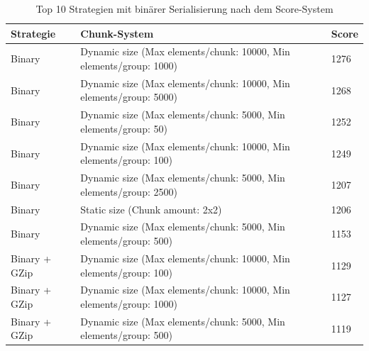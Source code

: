 \begin{table}[htp]
    \centering
    \caption{Top 10 Strategien mit binärer Serialisierung nach dem Score-System}
    \begin{tabular}{|l|l|l|}
    \hline
        Strategie & Chunk-System & Score \\
        \hline
        Binary & Dynamic size (Max elements/chunk: 10000, Min elements/group: 1000) & 1276\\
        Binary & Dynamic size (Max elements/chunk: 10000, Min elements/group: 5000) & 1268\\
        Binary & Dynamic size (Max elements/chunk: 5000, Min elements/group: 50) & 1252\\
        Binary & Dynamic size (Max elements/chunk: 10000, Min elements/group: 100) & 1249\\
        Binary & Dynamic size (Max elements/chunk: 5000, Min elements/group: 2500) & 1207\\
        Binary & Static size (Chunk amount: 2x2) & 1206\\
        Binary & Dynamic size (Max elements/chunk: 5000, Min elements/group: 500) & 1153\\
        Binary + GZip & Dynamic size (Max elements/chunk: 10000, Min elements/group: 100) & 1129\\
        Binary + GZip & Dynamic size (Max elements/chunk: 10000, Min elements/group: 1000) & 1127\\
        Binary + GZip & Dynamic size (Max elements/chunk: 5000, Min elements/group: 500) & 1119\\
        \hline
    \end{tabular}
    \label{tbl:topStratBin}
\end{table}

